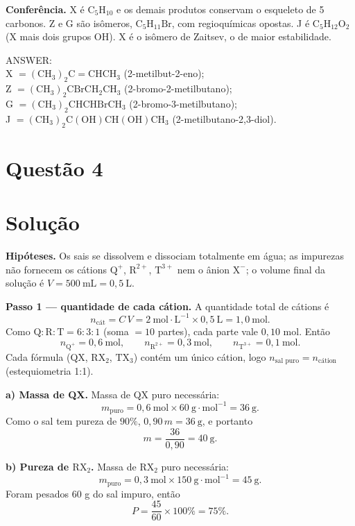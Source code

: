 \documentclass{article}%
\begin{document}
\textbf{Conferência.} X é $\mathrm{C_5H_{10}}$ e os demais produtos conservam o esqueleto de 5 carbonos. Z e G são isômeros, $\mathrm{C_5H_{11}Br}$, com regioquímicas opostas. J é $\mathrm{C_5H_{12}O_2}$ (X mais dois grupos OH). X é o isômero de Zaitsev, o de maior estabilidade.

\medskip
\noindent ANSWER:\\
X $=\mathrm{(CH_3)_2C{=}CHCH_3}$ (2-metilbut-2-eno);\\
Z $=\mathrm{(CH_3)_2CBrCH_2CH_3}$ (2-bromo-2-metilbutano);\\
G $=\mathrm{(CH_3)_2CHCHBrCH_3}$ (2-bromo-3-metilbutano);\\
J $=\mathrm{(CH_3)_2C(OH)CH(OH)CH_3}$ (2-metilbutano-2,3-diol).%
\newpage%
\section*{Questão 4}

\section*{Solução}

\textbf{Hipóteses.} Os sais se dissolvem e dissociam totalmente em água; as impurezas não fornecem os cátions $\mathrm{Q^+}$, $\mathrm{R^{2+}}$, $\mathrm{T^{3+}}$ nem o ânion $\mathrm{X^-}$; o volume final da solução é $V=500\ \mathrm{mL}=0{,}5\ \mathrm{L}$.

\textbf{Passo 1 --- quantidade de cada cátion.} A quantidade total de cátions é
\[
n_{\text{cát}} = C\,V = 2\ \mathrm{mol\cdot L^{-1}}\times 0{,}5\ \mathrm{L} = 1{,}0\ \mathrm{mol}.
\]
Como $\mathrm{Q}:\mathrm{R}:\mathrm{T}=6:3:1$ (soma $=10$ partes), cada parte vale $0{,}10$ mol. Então
\[
n_{\mathrm{Q^+}}=0{,}6\ \mathrm{mol},\qquad n_{\mathrm{R^{2+}}}=0{,}3\ \mathrm{mol},\qquad n_{\mathrm{T^{3+}}}=0{,}1\ \mathrm{mol}.
\]
Cada fórmula (QX, $\mathrm{RX_2}$, $\mathrm{TX_3}$) contém um único cátion, logo $n_{\text{sal puro}}=n_{\text{cátion}}$ (estequiometria 1:1).

\textbf{a) Massa de QX.} Massa de QX puro necessária:
\[
m_{\text{puro}} = 0{,}6\ \mathrm{mol}\times 60\ \mathrm{g\cdot mol^{-1}} = 36\ \mathrm{g}.
\]
Como o sal tem pureza de $90\%$, $0{,}90\,m = 36\ \mathrm{g}$, e portanto
\[
m=\frac{36}{0{,}90}=40\ \mathrm{g}.
\]

\textbf{b) Pureza de $\mathrm{RX_2}$.} Massa de $\mathrm{RX_2}$ puro necessária:
\[
m_{\text{puro}} = 0{,}3\ \mathrm{mol}\times 150\ \mathrm{g\cdot mol^{-1}} = 45\ \mathrm{g}.
\]
Foram pesados $60$ g do sal impuro, então
\[
P=\frac{45}{60}\times 100\% = 75\%.
\]
\end{document}
